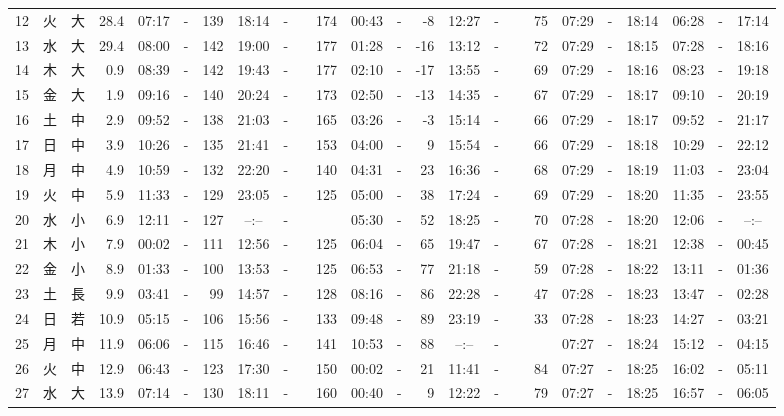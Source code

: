 \documentclass[12pt,a4j]{jsarticle}
\begin{document}
\begin{table}[htbp]
\begin{center}
{\begin{tabular}{|rc|cr|ccrccr|ccrccr|ccc|ccc|}
12 & 火 & 大 & 28.4 &  07:17 &-& 139 &  18:14 &-& 174 &  00:43 &-&  -8 &  12:27 &-&  75 & 07:29 & -& 18:14 & 06:28 & -& 17:14 \\
13 & 水 & 大 & 29.4 &  08:00 &-& 142 &  19:00 &-& 177 &  01:28 &-& -16 &  13:12 &-&  72 & 07:29 & -& 18:15 & 07:28 & -& 18:16 \\
14 & 木 & 大 &  0.9 &  08:39 &-& 142 &  19:43 &-& 177 &  02:10 &-& -17 &  13:55 &-&  69 & 07:29 & -& 18:16 & 08:23 & -& 19:18 \\
15 & 金 & 大 &  1.9 &  09:16 &-& 140 &  20:24 &-& 173 &  02:50 &-& -13 &  14:35 &-&  67 & 07:29 & -& 18:17 & 09:10 & -& 20:19 \\
16 & 土 & 中 &  2.9 &  09:52 &-& 138 &  21:03 &-& 165 &  03:26 &-&  -3 &  15:14 &-&  66 & 07:29 & -& 18:17 & 09:52 & -& 21:17 \\
17 & 日 & 中 &  3.9 &  10:26 &-& 135 &  21:41 &-& 153 &  04:00 &-&   9 &  15:54 &-&  66 & 07:29 & -& 18:18 & 10:29 & -& 22:12 \\
18 & 月 & 中 &  4.9 &  10:59 &-& 132 &  22:20 &-& 140 &  04:31 &-&  23 &  16:36 &-&  68 & 07:29 & -& 18:19 & 11:03 & -& 23:04 \\
19 & 火 & 中 &  5.9 &  11:33 &-& 129 &  23:05 &-& 125 &  05:00 &-&  38 &  17:24 &-&  69 & 07:29 & -& 18:20 & 11:35 & -& 23:55 \\
20 & 水 & 小 &  6.9 &  12:11 &-& 127 &  --:-- &-&~~~~~ &  05:30 &-&  52 &  18:25 &-&  70 & 07:28 & -& 18:20 & 12:06 & -& --:-- \\
21 & 木 & 小 &  7.9 &  00:02 &-& 111 &  12:56 &-& 125 &  06:04 &-&  65 &  19:47 &-&  67 & 07:28 & -& 18:21 & 12:38 & -& 00:45 \\
22 & 金 & 小 &  8.9 &  01:33 &-& 100 &  13:53 &-& 125 &  06:53 &-&  77 &  21:18 &-&  59 & 07:28 & -& 18:22 & 13:11 & -& 01:36 \\
23 & 土 & 長 &  9.9 &  03:41 &-&  99 &  14:57 &-& 128 &  08:16 &-&  86 &  22:28 &-&  47 & 07:28 & -& 18:23 & 13:47 & -& 02:28 \\
24 & 日 & 若 & 10.9 &  05:15 &-& 106 &  15:56 &-& 133 &  09:48 &-&  89 &  23:19 &-&  33 & 07:28 & -& 18:23 & 14:27 & -& 03:21 \\
25 & 月 & 中 & 11.9 &  06:06 &-& 115 &  16:46 &-& 141 &  10:53 &-&  88 &  --:-- &-&~~~~~ & 07:27 & -& 18:24 & 15:12 & -& 04:15 \\
26 & 火 & 中 & 12.9 &  06:43 &-& 123 &  17:30 &-& 150 &  00:02 &-&  21 &  11:41 &-&  84 & 07:27 & -& 18:25 & 16:02 & -& 05:11 \\
27 & 水 & 大 & 13.9 &  07:14 &-& 130 &  18:11 &-& 160 &  00:40 &-&   9 &  12:22 &-&  79 & 07:27 & -& 18:25 & 16:57 & -& 06:05 \\

\end{tabular}}
\end{center}
\end{table}
\end{document}
